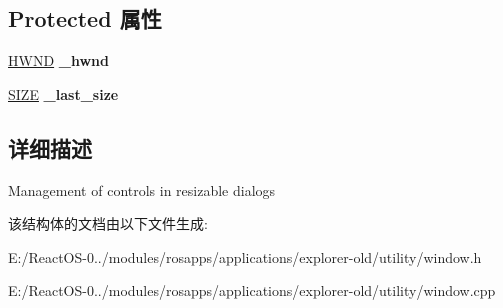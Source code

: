 \subsection*{Protected 属性}
\begin{DoxyCompactItemize}
\item 
\mbox{\label{struct_resize_manager_a856d40d786459024f72aca62d1667ec7}} 
\hyperlink{interfacevoid}{H\+W\+ND} {\bfseries \+\_\+hwnd}
\item 
\mbox{\label{struct_resize_manager_a60f878683cfe56fbd3a602e79b107fc8}} 
\hyperlink{structtag_s_i_z_e}{S\+I\+ZE} {\bfseries \+\_\+last\+\_\+size}
\end{DoxyCompactItemize}


\subsection{详细描述}
Management of controls in resizable dialogs 

该结构体的文档由以下文件生成\+:\begin{DoxyCompactItemize}
\item 
E\+:/\+React\+O\+S-\/0../modules/rosapps/applications/explorer-\/old/utility/window.\+h\item 
E\+:/\+React\+O\+S-\/0../modules/rosapps/applications/explorer-\/old/utility/window.\+cpp\end{DoxyCompactItemize}
